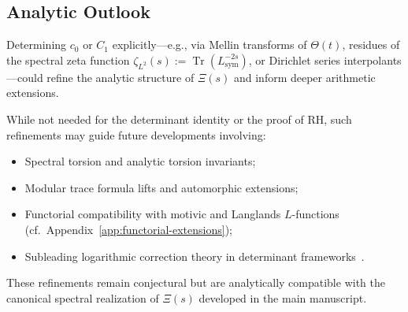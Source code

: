 \subsection*{Analytic Outlook}

Determining \( c_0 \) or \( C_1 \) explicitly—e.g., via Mellin transforms of \( \Theta(t) \), residues of the spectral zeta function \( \zeta_{L^2}(s) := \operatorname{Tr}(L_{\mathrm{sym}}^{-2s}) \), or Dirichlet series interpolants—could refine the analytic structure of \( \Xi(s) \) and inform deeper arithmetic extensions.

While not needed for the determinant identity or the proof of RH, such refinements may guide future developments involving:
\begin{itemize}
  \item Spectral torsion and analytic torsion invariants;
  \item Modular trace formula lifts and automorphic extensions;
  \item Functorial compatibility with motivic and Langlands \( L \)-functions (cf.~Appendix~\ref{app:functorial-extensions});
  \item Subleading logarithmic correction theory in determinant frameworks~\cite{Elizalde1994ZetaRegularization}.
\end{itemize}

\medskip
\noindent
These refinements remain conjectural but are analytically compatible with the canonical spectral realization of \( \Xi(s) \) developed in the main manuscript.
